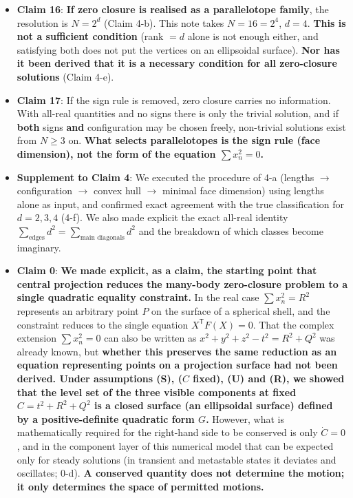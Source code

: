 \documentclass[
  10pt,
]{article}
\providecommand{\tightlist}{%
  \setlength{\itemsep}{0pt}\setlength{\parskip}{0pt}}
\begin{document}
\begin{itemize}
\tightlist
\item
  \textbf{Claim 16}: \textbf{If zero closure is realised as a
  parallelotope family}, the resolution is \(N = 2^d\) (Claim 4-b). This
  note takes \(N = 16 = 2^4\), \(d = 4\). \textbf{This is not a
  sufficient condition} (rank \(= d\) alone is not enough either, and
  satisfying both does not put the vertices on an ellipsoidal surface).
  \textbf{Nor has it been derived that it is a necessary condition for
  all zero-closure solutions} (Claim 4-e).
\item
  \textbf{Claim 17}: If the sign rule is removed, zero closure carries
  no information. With all-real quantities and no signs there is only
  the trivial solution, and if \textbf{both} signs \textbf{and}
  configuration may be chosen freely, non-trivial solutions exist from
  \(N\ge3\) on. \textbf{What selects parallelotopes is the sign rule
  (face dimension), not the form of the equation \(\sum x_n^2=0\).}
\item
  \textbf{Supplement to Claim 4}: We executed the procedure of 4-a
  (lengths \(\to\) configuration \(\to\) convex hull \(\to\) minimal
  face dimension) using lengths alone as input, and confirmed exact
  agreement with the true classification for \(d=2,3,4\) (4-f). We also
  made explicit the exact all-real identity
  \(\sum_{\text{edges}}d^2 = \sum_{\text{main diagonals}}d^2\) and the
  breakdown of which classes become imaginary.
\item
  \textbf{Claim 0}: \textbf{We made explicit, as a claim, the starting
  point that central projection reduces the many-body zero-closure
  problem to a single quadratic equality constraint.} In the real case
  \(\sum x_n^2 = R^2\) represents an arbitrary point \(P\) on the
  surface of a spherical shell, and the constraint reduces to the single
  equation \(X^{\mathsf T}F(X)=0\). That the complex extension
  \(\sum x_n^2 = 0\) can also be written as
  \(x^2+y^2+z^2-t^2 = R^2+Q^2\) was already known, but \textbf{whether
  this preserves the same reduction as an equation representing points
  on a projection surface had not been derived. Under assumptions (S),
  (\(C\) fixed), (U) and (R), we showed that the level set of the three
  visible components at fixed \(C = t^2+R^2+Q^2\) is a closed surface
  (an ellipsoidal surface) defined by a positive-definite quadratic form
  \(G\).} However, what is mathematically required for the right-hand
  side to be conserved is only \(\dot C=0\), and in the component layer
  of this numerical model that can be expected only for steady solutions
  (in transient and metastable states it deviates and oscillates; 0-d).
  \textbf{A conserved quantity does not determine the motion; it only
  determines the space of permitted motions.}
\end{itemize}
\end{document}
